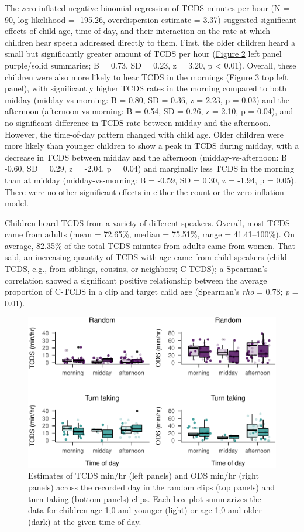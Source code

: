 \documentclass[,man,mask,floatsintext]{apa6}
\begin{document}
The zero-inflated negative binomial regression of TCDS minutes per hour
(N = 90, log-likelihood = -195.26, overdispersion estimate = 3.37)
suggested significant effects of child age, time of day, and their
interaction on the rate at which children hear speech addressed directly
to them. First, the older children heard a small but significantly
greater amount of TCDS per hour (\protect\hyperlink{fig2}{Figure 2} left
panel purple/solid summaries; B = 0.73, SD = 0.23, z = 3.20, p
\textless{} 0.01). Overall, these children were also more likely to hear
TCDS in the mornings (\protect\hyperlink{fig3}{Figure 3} top left
panel), with significantly higher TCDS rates in the morning compared to
both midday (midday-vs-morning: B = 0.80, SD = 0.36, z = 2.23, p = 0.03)
and the afternoon (afternoon-vs-morning: B = 0.54, SD = 0.26, z = 2.10,
p = 0.04), and no significant difference in TCDS rate between midday and
the afternoon. However, the time-of-day pattern changed with child age.
Older children were more likely than younger children to show a peak in
TCDS during midday, with a decrease in TCDS between midday and the
afternoon (midday-vs-afternoon: B = -0.60, SD = 0.29, z = -2.04, p =
0.04) and marginally less TCDS in the morning than at midday
(midday-vs-morning: B = -0.59, SD = 0.30, z = -1.94, p = 0.05). There
were no other significant effects in either the count or the
zero-inflation model.

Children heard TCDS from a variety of different speakers. Overall, most
TCDS came from adults (mean = 72.65\%, median = 75.51\%, range =
41.41--100\%). On average, 82.35\% of the total TCDS minutes from adults
came from women. That said, an increasing quantity of TCDS with age came
from child speakers (child-TCDS, e.g., from siblings, cousins, or
neighbors; C-TCDS); a Spearman's correlation showed a significant
positive relationship between the average proportion of C-TCDS in a clip
and target child age (Spearman's \emph{rho} = 0.78; \emph{p} = 0.01).

\begin{figure}
\centering
\includegraphics{Yeli-CLE_files/figure-latex/fig3-1.pdf}
\caption{\label{fig:fig3}Estimates of TCDS min/hr (left panels) and ODS
min/hr (right panels) across the recorded day in the random clips (top
panels) and turn-taking (bottom panels) clips. Each box plot summarizes
the data for children age 1;0 and younger (light) or age 1;0 and older
(dark) at the given time of day.}
\end{figure}
\end{document}
